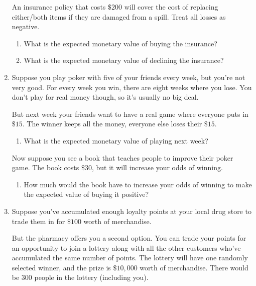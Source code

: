 \documentclass[justified]{tufte-book}
\providecommand{\tightlist}{%
  \setlength{\itemsep}{0pt}\setlength{\parskip}{0pt}}
\theoremstyle{definition}
\theoremstyle{definition}
\theoremstyle{definition}
\theoremstyle{remark}
\begin{document}
\begin{enumerate}
  An insurance policy that costs \(\$200\) will cover the cost of
  replacing either/both items if they are damaged from a spill. Treat
  all losses as negative.

  \begin{enumerate}
  \def\labelenumii{\alph{enumii}.}
  \tightlist
  \item
    What is the expected monetary value of buying the insurance?
  \item
    What is the expected monetary value of declining the insurance?
  \end{enumerate}
\item
  Suppose you play poker with five of your friends every week, but
  you're not very good. For every week you win, there are eight weeks
  where you lose. You don't play for real money though, so it's usually
  no big deal.

  But next week your friends want to have a real game where everyone
  puts in \(\$15\). The winner keeps all the money, everyone else loses
  their \(\$15\).

  \begin{enumerate}
  \def\labelenumii{\alph{enumii}.}
  \tightlist
  \item
    What is the expected monetary value of playing next week?
  \end{enumerate}

  Now suppose you see a book that teaches people to improve their poker
  game. The book costs \(\$30\), but it will increase your odds of
  winning.

  \begin{enumerate}
  \def\labelenumii{\alph{enumii}.}
  \setcounter{enumii}{1}
  \tightlist
  \item
    How much would the book have to increase your odds of winning to
    make the expected value of buying it positive?
  \end{enumerate}
\item
  Suppose you've accumulated enough loyalty points at your local drug
  store to trade them in for \(\$100\) worth of merchandise.

  But the pharmacy offers you a second option. You can trade your points
  for an opportunity to join a lottery along with all the other
  customers who've accumulated the same number of points. The lottery
  will have one randomly selected winner, and the prize is \(\$10,000\)
  worth of merchandise. There would be \(300\) people in the lottery
  (including you).


\end{enumerate}
\end{document}
